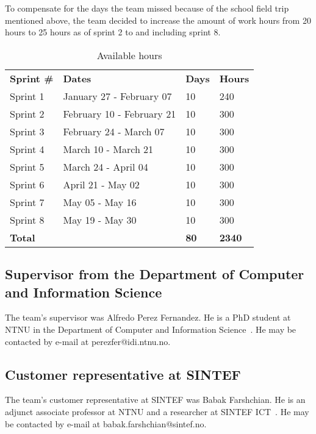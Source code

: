 To compensate for the days the team missed because of the school field trip mentioned above, the team decided to increase the amount of work hours from 20 hours to 25 hours as of sprint 2 to and including sprint 8.


\begin{table}[H]
\centering
{}
\begin{tabular}{|l|l|l|l|}
\hline
\textbf{Sprint \#} & \textbf{Dates} & \textbf{Days} & \textbf{Hours}\\
Sprint 1& January 27 - February 07 & 10  & 240 \\
Sprint 2 & February 10 - February 21 &10  & 300 \\
Sprint 3 & February 24 - March 07 &10 & 300 \\
Sprint 4 & March 10 - March 21 &10  &300 \\
Sprint 5 & March 24 - April 04 &10&  300 \\
Sprint 6 & April 21 - May 02 &10  &300 \\
Sprint 7 & May 05 - May 16 &10  &300 \\
Sprint 8 & May 19 - May 30 &10  &300 \\
\textbf{Total}&& \textbf{80}&  \textbf{2340}\\\hline
\end{tabular}
\caption{Available hours}
\label{tab:availHours}
\end{table}

\subsection{Supervisor from the Department of Computer and Information Science}
The team's supervisor was Alfredo Perez Fernandez. He is a PhD student at NTNU in the Department of Computer and Information Science~\cite{idi}. He may be contacted by e-mail at perezfer@idi.ntnu.no.

\subsection{Customer representative at SINTEF}
The team's customer representative at SINTEF was Babak Farshchian. He is an adjunct associate professor at NTNU and a researcher at SINTEF ICT~\cite{sintefict}. He may be contacted by e-mail at babak.farshchian@sintef.no.
